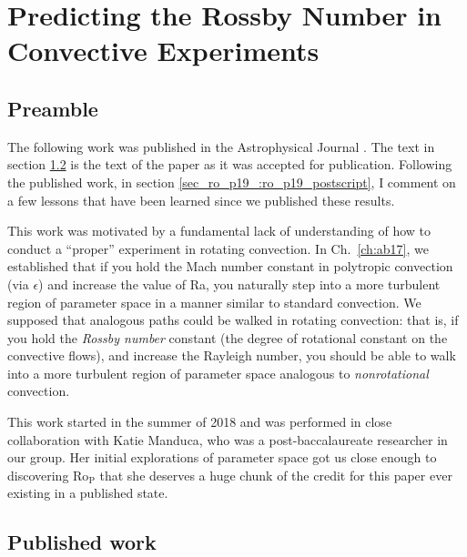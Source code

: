 \chapter{Predicting the Rossby Number in Convective Experiments}
\label{ch:ro_p19}

\section{Preamble}
The following work was published in the Astrophysical Journal \citep{anders&all2019}.
The text in section \ref{sec_ro_p19_:ro_p19_published} is the text of the paper as it was accepted for publication.
Following the published work, in section \ref{sec_ro_p19_:ro_p19_postscript}, I comment on a few lessons that have been learned since we published these results.

This work was motivated by a fundamental lack of understanding of how to conduct a ``proper'' experiment in rotating convection.
In Ch.~\ref{ch:ab17}, we established that if you hold the Mach number constant in polytropic convection (via $\epsilon$) and increase the value of Ra, you naturally step into a more turbulent region of parameter space in a manner similar to standard \RB convection.
We supposed that analogous paths could be walked in rotating convection: that is, if you hold the \emph{Rossby number} constant (the degree of rotational constant on the convective flows), and increase the Rayleigh number, you should be able to walk into a more turbulent region of parameter space analogous to \emph{nonrotational} \RB convection.

This work started in the summer of 2018 and was performed in close collaboration with Katie Manduca, who was a post-baccalaureate researcher in our group.
Her initial explorations of parameter space got us close enough to discovering Ro$_\text{P}$ that she deserves a huge chunk of the credit for this paper ever existing in a published state.

\section{Published work}
\label{sec_ro_p19_:ro_p19_published}

